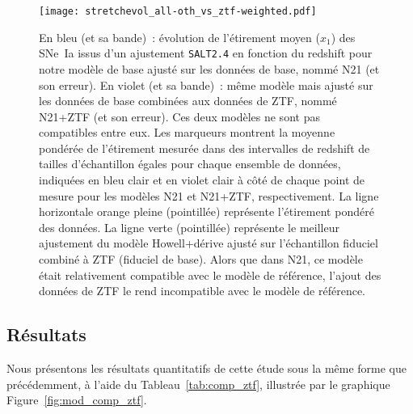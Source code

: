 \documentclass[../main/main.tex]{subfiles}
\begin{document}
\begin{figure}[p]
    \centering
    \texttt{[image: stretchevol\_all-oth\_vs\_ztf-weighted.pdf]}
    \caption[Évolution de l'étirement moyen des SNe~Ia en fonction du redshift
    issu de la prédiction de notre modèle de base selon l'échantillon
    utilisé]{\footnotesize En bleu (et sa bande)~: évolution de l'étirement
        moyen ($x_1$) des SNe~Ia issus d'un ajustement \texttt{SALT2.4} en
        fonction du redshift pour notre modèle de base ajusté sur les données de
        base, nommé N21 (et son erreur). En violet (et sa bande)~: même modèle
        mais ajusté sur les données de base combinées aux données de ZTF, nommé
        N21+ZTF (et son erreur). Ces deux modèles ne sont pas compatibles entre
        eux. Les marqueurs montrent la moyenne pondérée de l'étirement mesurée
        dans des intervalles de redshift de tailles d'échantillon égales pour
        chaque ensemble de données, indiquées en bleu clair et en violet clair à
        côté de chaque point de mesure pour les modèles N21 et N21+ZTF,
        respectivement. La ligne horizontale orange pleine (pointillée)
        représente l'étirement pondéré des données. La ligne verte (pointillée)
        représente le meilleur ajustement du modèle Howell+dérive ajusté sur
        l'échantillon fiduciel combiné à ZTF (fiduciel de base). Alors que dans
        N21, ce modèle était relativement compatible avec le modèle de
        référence, l'ajout des données de ZTF le rend incompatible avec le
    modèle de référence.}
    \label{fig:evol_all_ztf}
\end{figure}

\subsection{Résultats}\label{ssec:zres}

Nous présentons les résultats quantitatifs de cette étude sous la même forme que
précédemment, à l'aide du Tableau~\ref{tab:comp_ztf}, illustrée par le graphique
Figure~\ref{fig:mod_comp_ztf}.
\end{document}

